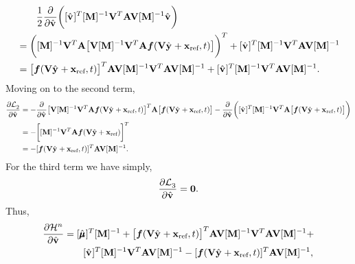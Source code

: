 \documentclass[3p,computermodern,10pt]{elsarticle}
\begin{document}
\begin{appendices}
\begin{align*}
& \qquad \frac{1}{2} \frac{\partial }{\partial \controllerDiscreteDumArgnt{}{}} \bigg( [\controllerDiscreteDumArgnt{}]^T [\massArgnt{n}]^{-1} \basisspace^T \stweightingMatArg{n} \basisspace [\massArgnt{n}]^{-1} \controllerDiscreteDumArgnt{}\bigg) \\
&= \bigg(  [\massArgnt{n}]^{-1} \basisspace^T \stweightingMatArg{n}  \big[ \basisspace  [\massArgnt{n}]^{-1}\basisspace^T                      
\stweightingMatArg{n}  \velocity(\veloargsromy) \big] \bigg)^T +   [\controllerDiscreteDumArgnt{}]^T [\massArgnt{n}]^{-1} \basisspace^T \stweightingMatArg{n} \basisspace [\massArgnt{n}]^{-1} \\
&= \big[ \velocity(\veloargsromy) \big]^T \stweightingMatArg{n} \basisspace [\massArgnt{n}]^{-1}\basisspace^T  \stweightingMatArg{n} \basisspace [\massArgnt{n}]^{-1} +   [\controllerDiscreteDumArgnt{}]^T [\massArgnt{n}]^{-1} \basisspace^T \stweightingMatArg{n} \basisspace [\massArgnt{n}]^{-1}. 
\end{align*}
Moving on to the second term,
\begin{align*}
\frac{\partial  \objectiveControlArg{}_2 }{\partial \controllerDiscreteDumArgnt{}{}} &= 
-\frac{\partial  }{\partial \controllerDiscreteDumArgnt{}{}}   \big[ \basisspace  [\massArgnt{n}]^{-1}\basisspace^T
\stweightingMatArg{n}  \velocity(\veloargsromy) \big]^T \stweightingMatArg{n} \big[ \velocity(\veloargsromy) \big]  - \frac{\partial  }{\partial \controllerDiscreteDumArgnt{}{}} \bigg( [\controllerDiscreteDumArgnt{}]^T[\massArgnt{n}]^{-1} \basisspace^T \stweightingMatArg{n} \big[ \velocity(\veloargsromy) \big]  \bigg)  \\
&=- \bigg[ [\massArgnt{n}]^{-1} \basisspace^T \stweightingMatArg{n} \velocity(\basisspace \genstateyDiscrete + \stateIntercept) \bigg]^T \\
&= - [\velocity(\veloargsromy) ]^T \stweightingMatArg{n} \basisspace [\massArgnt{n}]^{-1}. 
\end{align*}
For the third term we have simply,
$$ \frac{\partial  \objectiveControlArg{}_3 }{\partial \controllerDiscreteDumArgnt{}{}} = \bz .$$
Thus,
\begin{align*}
\frac{\partial \hamiltonianArg{n}}{\partial \controllerDiscreteDumArgnt{}} &= 
[\adjointDiscreteDumArgnt{}]^T[\massArgnt{n}]^{-1}  +  \big[ \velocity(\veloargsromy) \big]^T \stweightingMatArg{n} \basisspace [\massArgnt{n}]^{-1}\basisspace^T  \stweightingMatArg{n} \basisspace [\massArgnt{n}]^{-1} + \\
& \qquad   [\controllerDiscreteDumArgnt{}]^T [\massArgnt{n}]^{-1} \basisspace^T \stweightingMatArg{n} \basisspace [\massArgnt{n}]^{-1} - [\velocity(\veloargsromy) ]^T \stweightingMatArg{n} \basisspace [\massArgnt{n}]^{-1}, \\

\end{align*}
\end{appendices}
\end{document}
